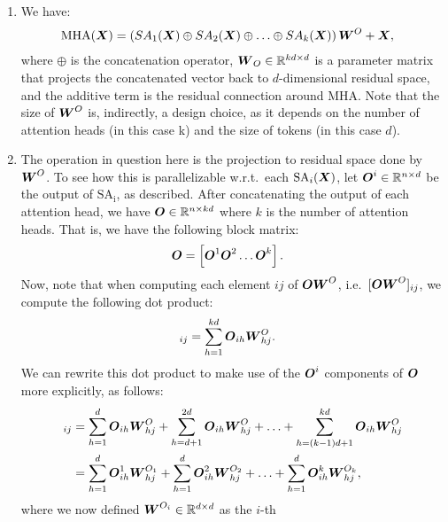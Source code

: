 \documentclass[11pt,a4paper]{article}
\newcommand\op[1]{\operatorname{#1}}
\begin{document}
\begin{enumerate}[label=(\alph*)]
    \item We have:
          \begin{align}
              \op{MHA}(\mX) & = \left(SA_1(\mX) \oplus SA_2(\mX) \oplus \ldots \oplus SA_k(\mX)\right)\mW^O + \mX,
          \end{align}
          where $\oplus$ is the concatenation operator,
          ${\boldsymbol{W}}_O\in\mathbb{R}^{kd\times d}$ is a parameter matrix that projects the
          concatenated vector back to $d$-dimensional residual space, and the
          additive term is the residual connection around MHA.
          Note that the size of ${\boldsymbol{W}}^O$ is, indirectly, a design choice, as it
          depends on the number of attention heads (in this case k) and the size
          of tokens (in this case $d$).
    \item The operation in question here is the projection to residual space
          done by ${\boldsymbol{W}}^O$.
          To see how this is parallelizable w.r.t.\ each
          $\op{SA}_i(\mX)$, let ${\boldsymbol{O}}^i\in\mathbb{R}^{n\times d}$ be the output of
          $\op{SA_i}$, as described. After concatenating the output of each
          attention head, we have ${\boldsymbol{O}}\in\mathbb{R}^{n\times kd}$ where $k$ is the
          number of attention heads. That is, we have the following block
          matrix:
          \begin{align}
              {\boldsymbol{O}} & = \left[{\boldsymbol{O}}^1 {\boldsymbol{O}}^2 \ldots {\boldsymbol{O}}^k\right].
          \end{align}
          Now, note that when computing each element $ij$ of ${\boldsymbol{O}}{\boldsymbol{W}}^O$,
          i.e.\ $[{\boldsymbol{O}}{\boldsymbol{W}}^O]_{ij}$, we compute the following dot product:
          \begin{align}
              [\mO\mW^O]_{ij} & = \sum_{h=1}^{kd} \mO_{ih}\mW^O_{hj}.
          \end{align}
          We can rewrite this dot product to make use of the ${\boldsymbol{O}}^i$ components
          of ${\boldsymbol{O}}$ more explicitly, as follows:
          \begin{align}
              [\mO\mW^O]_{ij} & = \sum_{h=1}^{d} \mO_{ih}\mW^O_{hj} + \sum_{h=d+1}^{2d} \mO_{ih}\mW^O_{hj} + \ldots + \sum_{h=(k-1)d+1}^{kd} \mO_{ih}\mW^O_{hj}         \\
                              & = \sum_{h=1}^{d} \mO^1_{ih}\mW^{O_1}_{hj} + \sum_{h=1}^{d} \mO^2_{ih}\mW^{O_2}_{hj} + \ldots + \sum_{h=1}^{d} \mO^k_{ih}\mW^{O_k}_{hj},
          \end{align}
          where we now defined ${\boldsymbol{W}}^{O_i}\in\mathbb{R}^{d\times d}$ as the $i$-th

\end{enumerate}
\end{document}
